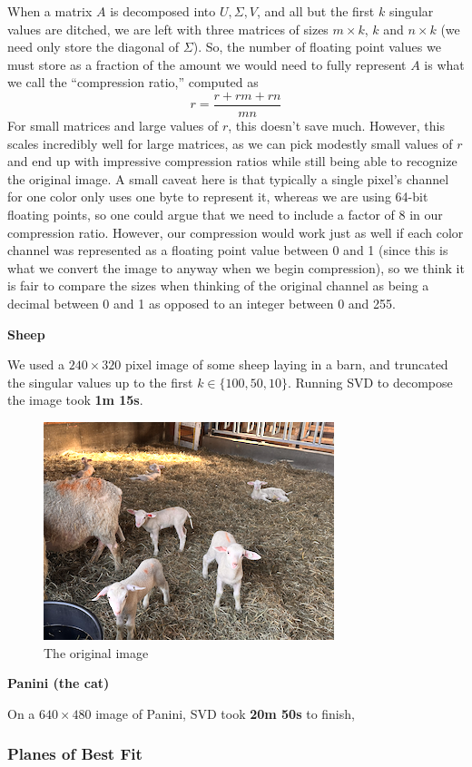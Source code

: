 \documentclass[12pt, letterpaper]{article}
\theoremstyle{definition}
\theoremstyle{remark}
\begin{document}
When a matrix $A$ is decomposed into $U, \Sigma, V$, and all but the first $k$ singular values are ditched, we are 
left with three matrices of sizes $m \times k$, $k$ and $n \times k$ (we need only store the diagonal of $\Sigma$).
So, the number of floating point values we must store as a fraction of the amount we would need to fully represent 
$A$ is what we call the ``compression ratio,'' computed as 
\[
    r = \frac{r + rm + rn}{mn}
\]
For small matrices and large values of $r$, this doesn't save much. However, this scales incredibly well for large matrices, 
as we can pick modestly small values of $r$ and end up with impressive compression ratios while still being able to recognize 
the original image. A small caveat here is that typically a single pixel's channel for one color only uses one byte to 
represent it, whereas we are using 64-bit floating points, so one could argue that we need to include a factor of 8 
in our compression ratio. However, our compression would work just as well if each color channel was represented 
as a floating point value between 0 and 1 (since this is what we convert the image to anyway when we begin 
compression), so we think it is fair to compare the sizes when thinking of the original channel as being a 
decimal between 0 and 1 as opposed to an integer between 0 and 255.

\begin{center}
    \textbf{Sheep}
\end{center}

We used a $240 \times 320$ pixel image of some sheep laying in a barn, and truncated the singular values
up to the first $k \in \{100, 50, 10\}$. Running SVD to decompose the image took \textbf{1m 15s}.

\begin{figure}[h]
	\centering
	\includegraphics{images/sheep.png}
	\caption{The original image}
	\label{fig:sheep}
\end{figure}

\begin{center}
    \textbf{Panini (the cat)}
\end{center}

On a $640 \times 480$ image of Panini, SVD took \textbf{20m 50s} to finish, 

\subsubsection{Planes of Best Fit}




\printbibliography
\end{document}
